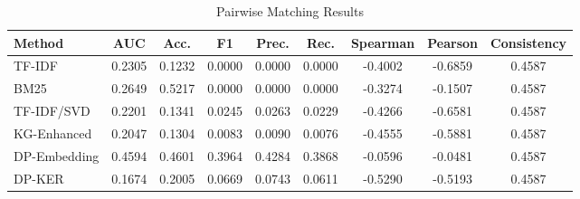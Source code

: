 \begin{table}[t]
\centering
\small
\caption{Pairwise Matching Results}
\label{tab:pairwise_results}
\begin{tabular}{lcccccccc}
\hline
Method & AUC & Acc. & F1 & Prec. & Rec. & Spearman & Pearson & Consistency \\
\hline
TF-IDF & 0.2305 & 0.1232 & 0.0000 & 0.0000 & 0.0000 & -0.4002 & -0.6859 & 0.4587 \\
BM25 & 0.2649 & 0.5217 & 0.0000 & 0.0000 & 0.0000 & -0.3274 & -0.1507 & 0.4587 \\
TF-IDF/SVD & 0.2201 & 0.1341 & 0.0245 & 0.0263 & 0.0229 & -0.4266 & -0.6581 & 0.4587 \\
KG-Enhanced & 0.2047 & 0.1304 & 0.0083 & 0.0090 & 0.0076 & -0.4555 & -0.5881 & 0.4587 \\
DP-Embedding & 0.4594 & 0.4601 & 0.3964 & 0.4284 & 0.3868 & -0.0596 & -0.0481 & 0.4587 \\
DP-KER & 0.1674 & 0.2005 & 0.0669 & 0.0743 & 0.0611 & -0.5290 & -0.5193 & 0.4587 \\
\hline
\end{tabular}
\end{table}

